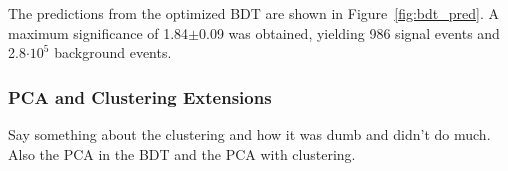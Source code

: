 The predictions from the optimized BDT are shown in Figure~\ref{fig:bdt_pred}. A maximum significance of 1.84$\pm$0.09 was obtained, yielding 986 signal events and 2.8$\cdot 10^5$ background events. 

\subsubsection{PCA and Clustering Extensions}
Say something about the clustering and how it was dumb and didn't do much. Also the PCA in the BDT and the PCA with clustering.



